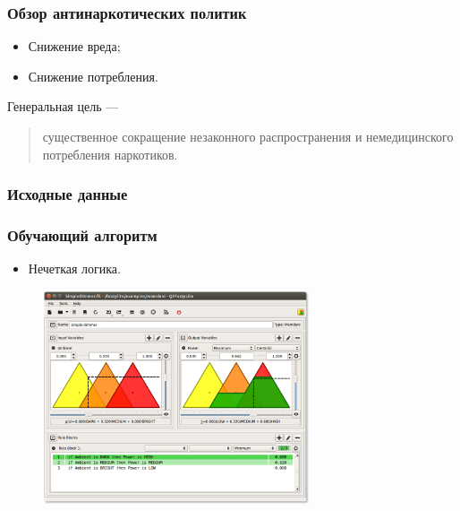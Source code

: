 \documentclass[t]{beamer}  %
\begin{document}
\begin{frame}
    \frametitle{Обзор антинаркотических политик}%
	\begin{itemize}
        \item Снижение вреда;
        \item Снижение потребления.
	\end{itemize}
    Генеральная цель ---
    \begin{quote}
        существенное сокращение незаконного распространения и немедицинского 
        потребления наркотиков. 
    \end{quote}
\end{frame}
\begin{frame}
    \frametitle{Исходные данные}
\end{frame}
\begin{frame}
    \frametitle{Обучающий алгоритм} 
	\begin{itemize}
        \item Нечеткая логика.
	\end{itemize}

    \begin{figure}
        \centering
        \includegraphics[width=0.7\textwidth]{simple_dimmer_fl.png}
    \end{figure}
\end{frame}
\end{document}
